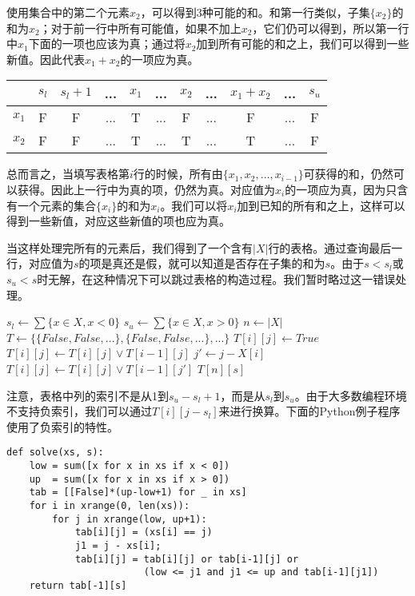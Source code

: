 \documentclass[UTF8]{article}
\begin{document}
使用集合中的第二个元素$x_2$，可以得到3种可能的和。和第一行类似，子集$\{x_2\}$的和为$x_2$；对于前一行中所有可能值，如果不加上$x_2$，它们仍可以得到，所以第一行中$x_1$下面的一项也应该为真；通过将$x_2$加到所有可能的和之上，我们可以得到一些新值。因此代表$x_1 + x_2$的一项应为真。

\begin{tabular}{|c|c|c|c|c|c|c|c|c|c|c|}
\hline
 & $s_l$ & $s_l+1$ & ... & $x_1$ & ... & $x_2$ & ... & $x_1 + x_2$ & ... & $s_u$ \\
\hline
$x_1$ & F & F & ... & T & ... & F & ... & F & ... & F \\
\hline
$x_2$ & F & F & ... & T & ... & T & ... & T & ... & F \\
\hline
\end{tabular}

总而言之，当填写表格第$i$行的时候，所有由$\{x_1, x_2, ..., x_{i-1}\}$可获得的和，仍然可以获得。因此上一行中为真的项，仍然为真。对应值为$x_i$的一项应为真，因为只含有一个元素的集合$\{x_i\}$的和为$x_i$。我们可以将$x_i$加到已知的所有和之上，这样可以得到一些新值，对应这些新值的项也应为真。

当这样处理完所有的元素后，我们得到了一个含有$|X|$行的表格。通过查询最后一行，对应值为$s$的项是真还是假，就可以知道是否存在子集的和为$s$。由于$s < s_l$或$s_u < s$时无解，在这种情况下可以跳过表格的构造过程。我们暂时略过这一错误处理。

\begin{algorithmic}[1]
  \State $s_l \gets \sum \{x \in X, x < 0\}$
  \State $s_u \gets \sum \{x \in X, x > 0\}$
  \State $n \gets |X|$
  \State $T \gets \{\{False, False, ...\}, \{False, False, ...\}, ...\}$ 
        \State $T[i][j] \gets True$
      \EndIf
        \State $T[i][j] \gets T[i][j] \lor T[i-1][j]$
        \State $j' \gets j - X[i]$
          \State $T[i][j] \gets T[i][j] \lor T[i-1][j']$
        \EndIf
      \EndIf
    \EndFor
  \EndFor
  \State \Return $T[n][s]$
\EndFunction
\end{algorithmic}

注意，表格中列的索引不是从1到$s_u-s_l + 1$，而是从$s_l$到$s_u$。由于大多数编程环境不支持负索引，我们可以通过$T[i][j-s_l]$来进行换算。下面的Python例子程序使用了负索引的特性。

\lstset{language=Python}
\begin{lstlisting}
def solve(xs, s):
    low = sum([x for x in xs if x < 0])
    up  = sum([x for x in xs if x > 0])
    tab = [[False]*(up-low+1) for _ in xs]
    for i in xrange(0, len(xs)):
        for j in xrange(low, up+1):
            tab[i][j] = (xs[i] == j)
            j1 = j - xs[i];
            tab[i][j] = tab[i][j] or tab[i-1][j] or
                        (low <= j1 and j1 <= up and tab[i-1][j1])
    return tab[-1][s]
\end{lstlisting}
\end{document}
